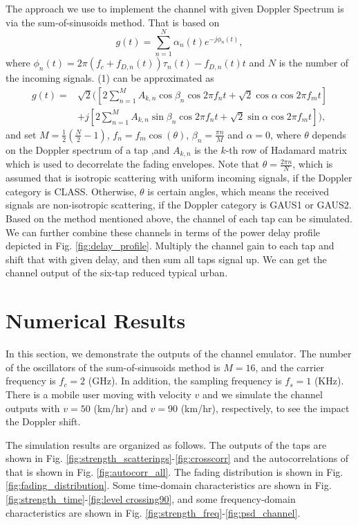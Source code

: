 \documentclass[12pt, draftclsnofoot, onecolumn]{IEEEtran}
\begin{document}
The approach we use to implement the channel with given Doppler Spectrum is via the sum-of-sinusoids method. That is based on 
\begin{equation}
g(t)=\sum^N_{n=1}\alpha_n(t)e^{-j\phi_n(t) }, 
\end{equation}
where $\phi_n(t)=2\pi{(f_c+f_{D,n}(t))\tau_n(t)-f_{D,n}(t)t}$ and $N$ is the number of the incoming signals. (1) can be approximated as
\begin{equation}
\begin{aligned}
g(t)=&\sqrt{2}\Big([2\sum^M_{n=1}A_{k,n}\cos\beta_n\cos 2\pi f_n t+\sqrt{2}\cos\alpha\cos 2\pi f_m t] \\
&+j[2\sum^M_{n=1}A_{k,n}\sin\beta_n\cos 2\pi f_n t+\sqrt{2}\sin\alpha\cos 2\pi f_mt ]\Big),
\end{aligned}
\end{equation}
and set $M = \frac{1}{2}(\frac{N}{2}-1)$, $f_n = f_m\cos(\theta)$, $\beta_n=\frac{\pi n}{M}$ and $\alpha=0$, where $\theta$ depends on the Doppler spectrum of a tap ,and $A_{k,n}$ is the $k$-th row of Hadamard matrix which is used to decorrelate the fading envelopes. Note that $ \theta =  \frac{2\pi n}{N}$, which is assumed that is isotropic scattering with uniform incoming signals, if the Doppler category is CLASS. Otherwise, $\theta$ is certain angles, which means the received signals are non-isotropic scattering, if the Doppler category is GAUS1 or GAUS2. Based on the method mentioned above, the channel of each tap can be simulated. We can further combine these channels in terms of the power delay profile depicted in Fig. \ref{fig:delay_profile}. Multiply the channel gain to each tap and shift that with given delay, and then sum all taps signal up. We can get the channel output of the six-tap reduced typical urban.

\newpage

\section{Numerical Results}
In this section, we demonstrate the outputs of the channel emulator. The number of the oscillators of the sum-of-sinusoids method is $M=16$, and the carrier frequency is $f_c = 2$ (GHz). In addition, the sampling frequency is $f_s = 1$ (KHz). There is a mobile user moving with velocity $v$ and we simulate the channel outputs with $v=50$ (km/hr) and $v= 90$ (km/hr), respectively, to see the impact the Doppler shift.

The simulation results are organized as follows.
The outputs of the taps are shown in Fig. \ref{fig:strength_scatterings}-\ref{fig:crosscorr} and the autocorrelations of that is shown in Fig. \ref{fig:autocorr_all}. 
The fading distribution is shown in Fig.\ref{fig:fading_distribution}. 
Some time-domain characteristics are shown in Fig.  \ref{fig:strength_time}-\ref{fig:level crossing90}, and some frequency-domain characteristics are shown in Fig. \ref{fig:strength_freq}-\ref{fig:psd_channel}.
\end{document}
